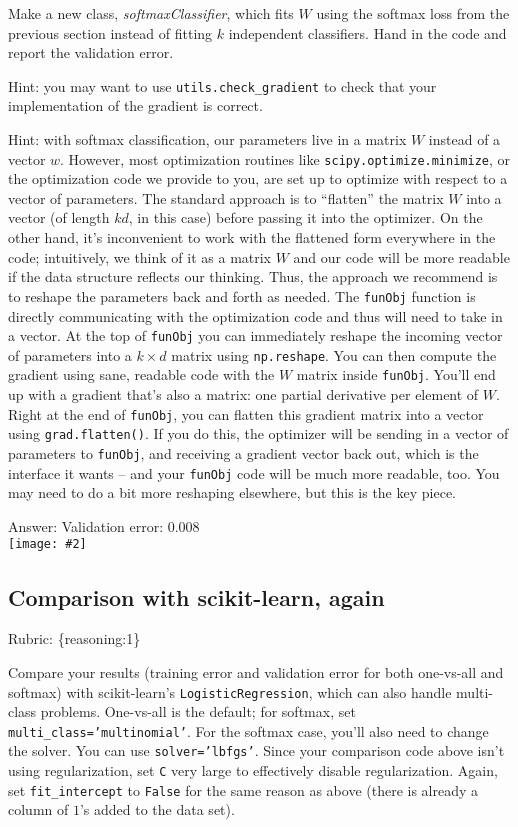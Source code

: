\documentclass{article}
\def\rubric#1{\gre{Rubric: \{#1\}}}{}
\def\ans#1{\par\gre{Answer: #1}}
\def\blu#1{{\color{blu}#1}}
\def\gre#1{{\color{gre}#1}}
\newcommand{\fig}[2]{\texttt{[image: \#2]}}
\begin{document}
Make a new class, \emph{softmaxClassifier}, which fits $W$ using the softmax loss from the previous section instead of fitting $k$ independent classifiers. \blu{Hand in the code and report the validation error}.

Hint: you may want to use \verb|utils.check_gradient| to check that your implementation of the gradient is correct.

Hint: with softmax classification, our parameters live in a matrix $W$ instead of a vector $w$. However, most optimization routines like \texttt{scipy.optimize.minimize}, or the optimization code we provide to you, are set up to optimize with respect to a vector of parameters. The standard approach is to ``flatten'' the matrix $W$ into a vector (of length $kd$, in this case) before passing it into the optimizer. On the other hand, it's inconvenient to work with the flattened form everywhere in the code; intuitively, we think of it as a matrix $W$ and our code will be more readable if the data structure reflects our thinking. Thus, the approach we recommend is to reshape the parameters back and forth as needed. The \texttt{funObj} function is directly communicating with the optimization code and thus will need to take in a vector. At the top of \texttt{funObj} you can immediately reshape the incoming vector of parameters into a $k \times d$ matrix using \texttt{np.reshape}. You can then compute the gradient using sane, readable code with the $W$ matrix inside \texttt{funObj}. You'll end up with a gradient that's also a matrix: one partial derivative per element of $W$. Right at the end of \texttt{funObj}, you can flatten this gradient matrix into a vector using \texttt{grad.flatten()}. If you do this, the optimizer will be sending in a vector of parameters to \texttt{funObj}, and receiving a gradient vector back out, which is the interface it wants -- and your \texttt{funObj} code will be much more readable, too. You may need to do a bit more reshaping elsewhere, but this is the key piece.

\ans{Validation error: 0.008}\\
\fig{0.8}{../figs/soft}

\subsection{Comparison with scikit-learn, again}
\rubric{reasoning:1}

Compare your results (training error and validation error for both one-vs-all and softmax) with scikit-learn's \texttt{LogisticRegression},
which can also handle multi-class problems.
One-vs-all is the default; for softmax, set \texttt{multi\string_class='multinomial'}. For the softmax case,
you'll also need to change the solver. You can use \texttt{solver='lbfgs'}.
Since your comparison code above isn't using regularization, set \texttt{C} very large to effectively disable regularization.
Again, set \texttt{fit\string_intercept} to \texttt{False} for the same reason as above (there is already a column of $1$'s added to the data set).
\end{document}
